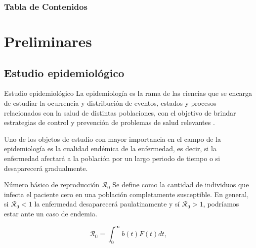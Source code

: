 \documentclass[9pt]{beamer}
\subtitle{\\
\LARGE{Predicción del comportamiento de una enfermedad} \\
\LARGE{simulada en autómatas celulares con un algoritmo}\\
\LARGE{propuesto en redes neuronales}}
\author{Jorge Andres Ibañez Huertas}
\institute{Central University, Bogotá}
\date{\today}
\begin{document}
\titlepage

\begin{frame}
\frametitle{Tabla de Contenidos}
\tableofcontents
\end{frame}

\section{Preliminares}
\subsection{Estudio epidemiológico}
\begin{frame}{Estudio epidemiológico}
La epidemiología es la rama de las ciencias que se encarga de estudiar la ocurrencia y distribución de eventos, estados y procesos relacionados con la salud de distintas poblaciones, con el objetivo de brindar estrategias de control y prevención de problemas de salud relevantes \cite{epiDictionary}.

Uno de los objetos de estudio con mayor importancia en el campo de la epidemiología es la cualidad endémica de la enfermedad, es decir, si la enfermedad afectará a la población por un largo periodo de tiempo o si desaparecerá gradualmente. 

\begin{alertblock}{Número básico de reproducción $\mathcal{R}_0$}
Se define como la cantidad de individuos que infecta el paciente cero en una población completamente susceptible. En general, si $\mathcal{R}_0<1$ la enfermedad desaparecerá paulatinamente y sí $\mathcal{R}_0>1$, podríamos estar ante un caso de endemia.

\begin{equation}\label{eq:R0}
 \mathcal{R}_0 = \int_0^\infty b(t)F(t) dt,
\end{equation}
\end{alertblock}



\end{frame}
\end{document}
